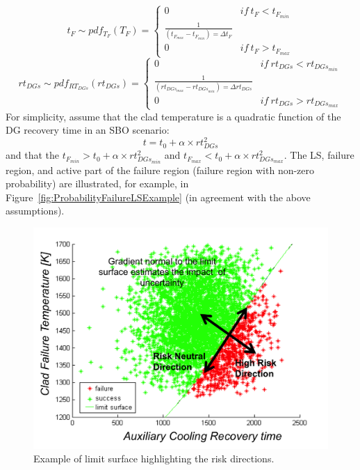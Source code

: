 \begin{equation}
t_{F}\sim pdf_{T_{F}}\left ( T_{F} \right )=\left\{\begin{matrix}
0 & if \: t_{F}< t_{F_{min}} \\ 
\frac{1}{\left ( t_{F_{max}}- t_{F_{min}} \right )=\Delta t_{F}} & \\ 
0 & if \: t_{F}>  t_{F_{max}} 
\end{matrix}\right.
\end{equation}
%
%
\begin{equation}
rt_{DGs}\sim pdf_{RT_{DGs}}\left ( rt_{DGs} \right )=\left\{\begin{matrix}
0 & if \: rt_{DGs}<rt_{DGs_{min}}   \\ 
\frac{1}{\left ( rt_{DGs_{max}} - rt_{DGs_{min}} \right )=\Delta rt_{DGs}} & \\ 
0 & if \: rt_{DGs}>rt_{DGs_{max}} 
\end{matrix}\right.
\end{equation}
For simplicity, assume that the clad temperature is a quadratic function of the DG recovery time in an SBO scenario:
\begin{equation}
  t = t_{0}+\alpha \times rt_{DGs}^{2}
\end{equation}
and that the  $ t_{F_{min}} > t_{0}+\alpha \times rt_{DGs_{min}}^{2}$
and $t_{F_{max}} < t_{0}+\alpha \times rt_{DGs_{max}}^{2}$.
The LS, failure region, and active part of the failure region (failure region with non-zero probability) are illustrated, for example, in Figure~\ref{fig:ProbabilityFailureLSExample} (in agreement with the above assumptions).
\begin{figure}[h!]
  \centering
  \includegraphics[width=1.0\textwidth]  {pics/ExampleLSwitRiskDirections.png}
  \caption{Example of limit surface highlighting the risk directions.}
  \label{fig:ExampleLSwitRiskDirections}
\end{figure}
